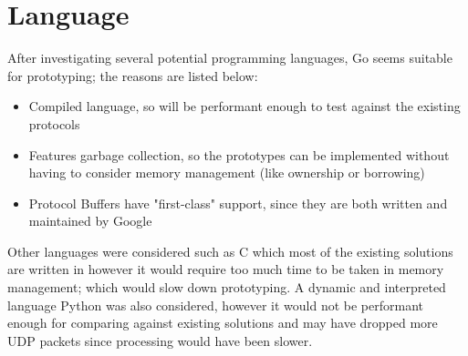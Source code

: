 \section{Language}
After investigating several potential programming languages, Go seems suitable for prototyping; the reasons are listed below:

\begin{itemize}
    \item Compiled language, so will be performant enough to test against the existing protocols
    \item Features garbage collection, so the prototypes can be implemented without having to consider memory management (like ownership or borrowing)
    \item Protocol Buffers have "first-class" support, since they are both written and maintained by Google
\end{itemize}

Other languages were considered such as C which most of the existing solutions are written in however it would require too much time to be taken in memory management; which would slow down prototyping. A dynamic and interpreted language Python was also considered, however it would not be performant enough for comparing against existing solutions and may have dropped more UDP packets since processing would have been slower.
